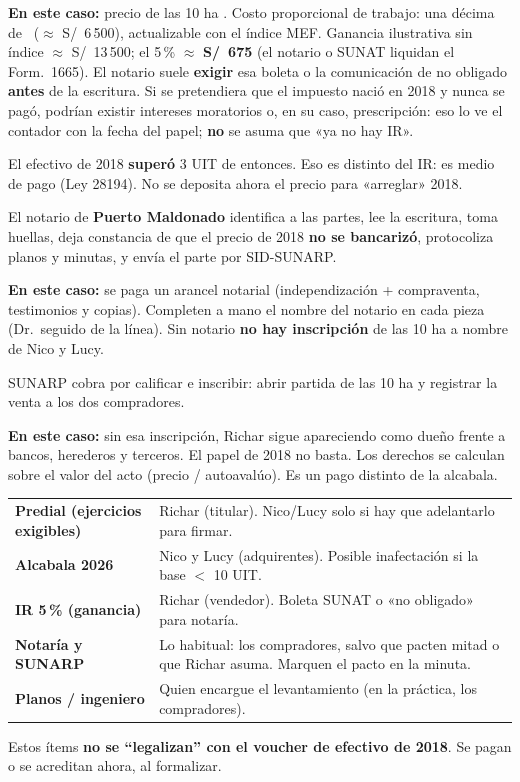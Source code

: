 \documentclass[12pt,a4paper]{article}
\begin{document}
\textbf{En este caso:} precio de las 10 ha \MontoPago. Costo proporcional de trabajo: una décima de \PrecioAdquisicionMatriz\ ($\approx$ S/\ 6\,500), actualizable con el índice MEF. Ganancia ilustrativa sin índice $\approx$ S/\ 13\,500; el 5\,\% $\approx$ \textbf{S/\ 675} (el notario o SUNAT liquidan el Form.\ 1665). El notario suele \textbf{exigir} esa boleta o la comunicación de no obligado \textbf{antes} de la escritura. Si se pretendiera que el impuesto nació en 2018 y nunca se pagó, podrían existir intereses moratorios o, en su caso, prescripción: eso lo ve el contador con la fecha del papel; \textbf{no} se asuma que «ya no hay IR».

El efectivo de 2018 \textbf{superó} 3 UIT de entonces. Eso es distinto del IR: es medio de pago (Ley 28194). No se deposita ahora el precio para «arreglar» 2018.

El notario de \textbf{Puerto Maldonado} identifica a las partes, lee la escritura, toma huellas, deja constancia de que el precio de 2018 \textbf{no se bancarizó}, protocoliza planos y minutas, y envía el parte por SID-SUNARP.

\textbf{En este caso:} se paga un arancel notarial (independización + compraventa, testimonios y copias). Completen a mano el nombre del notario en cada pieza (Dr.\ seguido de la línea). Sin notario \textbf{no hay inscripción} de las 10 ha a nombre de Nico y Lucy.

SUNARP cobra por calificar e inscribir: abrir partida de las 10 ha y registrar la venta a los dos compradores.

\textbf{En este caso:} sin esa inscripción, Richar sigue apareciendo como dueño frente a bancos, herederos y terceros. El papel de 2018 no basta. Los derechos se calculan sobre el valor del acto (precio / autoavalúo). Es un pago distinto de la alcabala.

{\small\renewcommand{\arraystretch}{1.25}
\noindent\begin{tabularx}{\linewidth}{@{}>{\bfseries}p{4.2cm}>{\raggedright\arraybackslash}X@{}}
Predial (ejercicios exigibles) & Richar (titular). Nico/Lucy solo si hay que adelantarlo para firmar. \\
Alcabala 2026 & Nico y Lucy (adquirentes). Posible inafectación si la base $<$ 10 UIT. \\
IR 5\,\% (ganancia) & Richar (vendedor). Boleta SUNAT o «no obligado» para notaría. \\
Notaría y SUNARP & Lo habitual: los compradores, salvo que pacten mitad o que Richar asuma. Marquen el pacto en la minuta. \\
Planos / ingeniero & Quien encargue el levantamiento (en la práctica, los compradores). \\
\end{tabularx}}

\vspace{0.35em}
\noindent Estos ítems \textbf{no se ``legalizan'' con el voucher de efectivo de 2018}. Se pagan o se acreditan ahora, al formalizar.

\LugarFecha
\FirmasCompradores
\vspace{0.4em}
\noindent
{}
\end{document}
